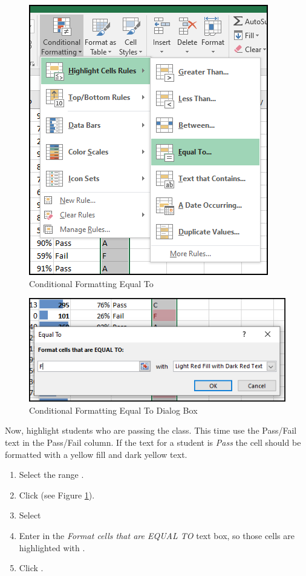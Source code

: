 \begin{figure}[H]
	\centering
	\includegraphics[width=\maxwidth{.95\linewidth}]{gfx/ch03_fig20}
	\caption{Conditional Formatting Equal To}
	\label{03:fig20}
\end{figure}

\begin{figure}[H]
	\centering
	\includegraphics[width=\maxwidth{.95\linewidth}]{gfx/ch03_fig21}
	\caption{Conditional Formatting Equal To Dialog Box}
	\label{03:fig21}
\end{figure}

Now, highlight students who are passing the class. This time use the Pass/Fail text in the Pass/Fail column. If the text for a student is \textit{Pass} the cell should be formatted with a yellow fill and dark yellow text.

\begin{enumbox}
	\begin{enumerate}
		\item Select the range .
		\item Click  (see Figure \ref{03:fig20}).
		\item Select 
		\item Enter  in the \textit{Format cells that are EQUAL TO} text box, so those cells are highlighted with .
		\item Click .
	\end{enumerate}
\end{enumbox}
	
